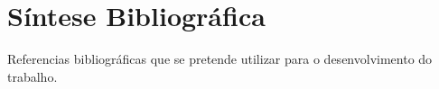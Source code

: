 \documentclass[
    12pt,               %
    a4paper,            %
    english,            %
    brazil,             %
    ]{article}
\begin{document}
    \vspace{-4.3em}
    \renewcommand\refname{}

    

\section{Síntese Bibliográfica}

Referencias bibliográficas que se pretende utilizar para o desenvolvimento do trabalho.

% 
\end{document}
